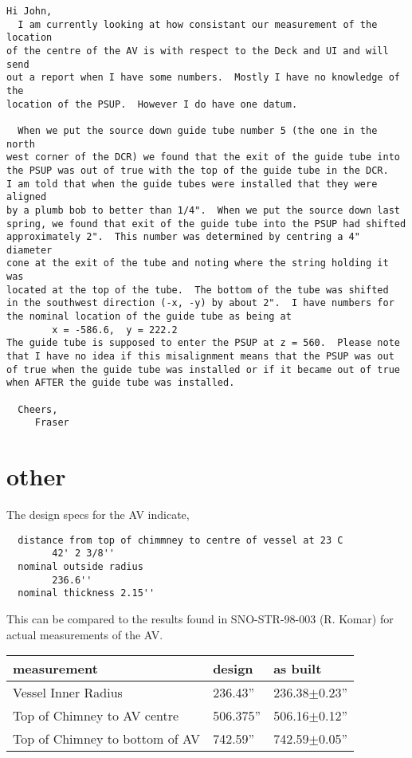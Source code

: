 \begin{verbatim}
Hi John,
  I am currently looking at how consistant our measurement of the location
of the centre of the AV is with respect to the Deck and UI and will send
out a report when I have some numbers.  Mostly I have no knowledge of the
location of the PSUP.  However I do have one datum.
  
  When we put the source down guide tube number 5 (the one in the north
west corner of the DCR) we found that the exit of the guide tube into 
the PSUP was out of true with the top of the guide tube in the DCR.  
I am told that when the guide tubes were installed that they were aligned
by a plumb bob to better than 1/4".  When we put the source down last 
spring, we found that exit of the guide tube into the PSUP had shifted
approximately 2".  This number was determined by centring a 4" diameter
cone at the exit of the tube and noting where the string holding it was
located at the top of the tube.  The bottom of the tube was shifted
in the southwest direction (-x, -y) by about 2".  I have numbers for
the nominal location of the guide tube as being at 
        x = -586.6,  y = 222.2
The guide tube is supposed to enter the PSUP at z = 560.  Please note
that I have no idea if this misalignment means that the PSUP was out
of true when the guide tube was installed or if it became out of true
when AFTER the guide tube was installed.  
  
  Cheers,
     Fraser
\end{verbatim}

  
\section{other}
The design specs for the AV indicate,
\begin{verbatim}
  distance from top of chimmney to centre of vessel at 23 C
        42' 2 3/8''
  nominal outside radius
        236.6''
  nominal thickness 2.15''
\end{verbatim}
This can be compared to the results found in SNO-STR-98-003 (R. Komar) 
for actual measurements of the AV.
\begin{table}[htbp]
\begin{center}
\begin{tabular}{|l|l|l|}
\hline
measurement                    & design     & as built \\ \hline
Vessel Inner Radius            &  236.43''  & 236.38$\pm$0.23'' \\ 
Top of Chimney to AV centre    & 506.375''  & 506.16$\pm$0.12'' \\
Top of Chimney to bottom of AV & 742.59''   & 742.59$\pm$0.05'' \\
\hline
\end{tabular}
\end{center}
\end{table}
  
